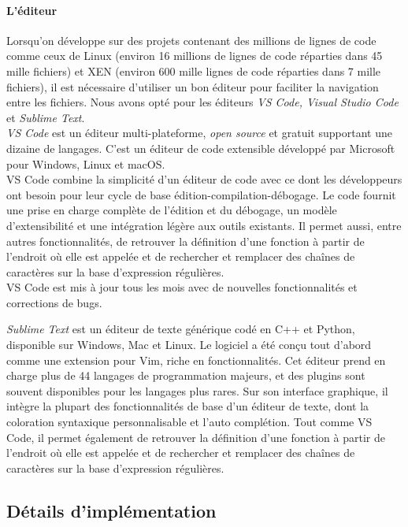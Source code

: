 \paragraph{\textbf{L'éditeur}}
\par\noindent
\par\noindent Lorsqu'on développe sur des projets contenant des millions de lignes de code comme ceux de Linux (environ 16 millions de lignes de code réparties dans 45 mille fichiers) \cite{linux} et XEN (environ 600 mille lignes de code réparties dans 7 mille fichiers), il est nécessaire d'utiliser un bon éditeur pour faciliter la navigation entre les fichiers. Nous avons opté pour les éditeurs \emph{VS Code, Visual Studio Code} et \emph{Sublime Text}.\\

\emph{VS Code} est un éditeur multi-plateforme, \textit{open source} et gratuit supportant une dizaine de langages. C'est un éditeur de code extensible développé par Microsoft pour Windows, Linux et macOS.\\
VS Code combine la simplicité d'un éditeur de code avec ce dont les développeurs ont besoin pour leur cycle de base édition-compilation-débogage. Le code fournit une prise en charge complète de l'édition et du débogage, un modèle d'extensibilité et une intégration légère aux outils existants. Il permet aussi, entre autres fonctionnalités, de retrouver la définition d'une fonction à partir de l'endroit où elle est appelée et de rechercher et remplacer des chaînes de caractères sur la base d'expression régulières.\\
 VS Code est mis à jour tous les mois avec de nouvelles fonctionnalités et corrections de bugs.

\emph{Sublime Text} est un éditeur de texte générique codé en C++ et Python, disponible sur Windows, Mac et Linux. Le logiciel a été conçu tout d'abord comme une extension pour Vim, riche en fonctionnalités. Cet éditeur prend en charge plus de 44 langages de programmation majeurs, et des plugins sont souvent disponibles pour les langages plus rares. Sur son interface graphique, il intègre la plupart des fonctionnalités de base d'un éditeur de texte, dont la coloration syntaxique personnalisable et l’auto complétion. Tout comme VS Code, il permet également de retrouver la définition d'une fonction à partir de l'endroit où elle est appelée et de rechercher et remplacer des chaînes de caractères sur la base d'expression régulières.

\subsection{Détails d'implémentation}
